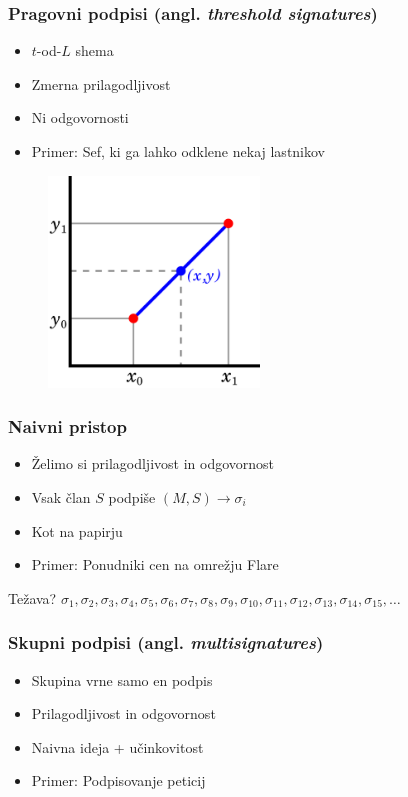 \documentclass{beamer}    %
\begin{document}
\begin{frame}
    \frametitle{Pragovni podpisi (angl. \textit{threshold signatures})}
    \begin{multicols*}{2}
        \begin{itemize}
            \item $t$-od-$L$ shema
            \item Zmerna prilagodljivost
            \item Ni odgovornosti
            \item Primer: Sef, ki ga lahko odklene nekaj lastnikov
        \end{itemize}
    \begin{figure}
        \includegraphics[width=0.5\textwidth]{images/interpolation.png}
    \end{figure}
    \end{multicols*}
\end{frame}

\begin{frame}
    \frametitle{Naivni pristop}
    \begin{itemize}
        \item Želimo si prilagodljivost in odgovornost
        \item Vsak član $S$ podpiše $(M, S) \rightarrow \sigma_i$
        \item Kot na papirju
        \item Primer: Ponudniki cen na omrežju Flare 
    \end{itemize}
    \vspace{1cm}
    Težava?
        $\sigma_1, \sigma_2, \sigma_3, \sigma_4, \sigma_5, \sigma_6,
        \sigma_7,  \sigma_8, \sigma_9, \sigma_{10}, \sigma_{11}, \sigma_{12}, 
        \sigma_{13}, \sigma_{14}, \sigma_{15}, \dots$
\end{frame}

\begin{frame}
    \frametitle{Skupni podpisi (angl. \textit{multisignatures})}
    \begin{itemize}
        \item Skupina vrne samo en podpis
        \item Prilagodljivost in odgovornost
        \item Naivna ideja + učinkovitost
        \item Primer: Podpisovanje peticij
    \end{itemize}
\end{frame}
\end{document}

